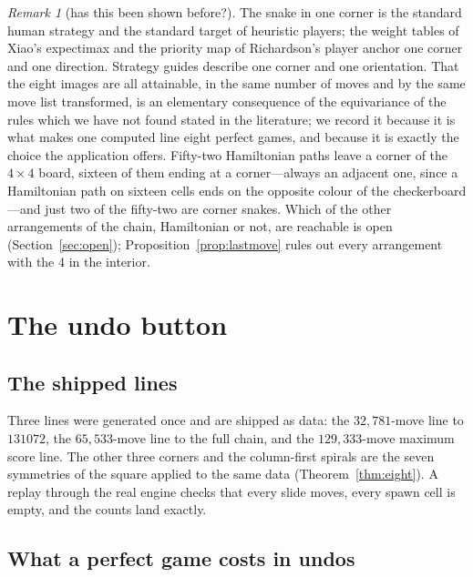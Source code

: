 \documentclass[11pt]{article}
\theoremstyle{definition}
\theoremstyle{remark}
\newtheorem{remark}[theorem]{Remark}
\begin{document}
\begin{remark}[has this been shown before?]
The snake in one corner is the standard human strategy and the standard
target of heuristic players; the weight tables of Xiao's expectimax
\cite{nneonneo2014} and the priority map of Richardson's player
\cite{richardson2014} anchor one corner and one direction. Strategy guides
describe one corner and one orientation. That the eight images are all
attainable, in the same number of moves and by the same move list
transformed, is an elementary consequence of the equivariance of the
rules which we have not found stated in the literature; we record it
because it is what makes one computed line eight perfect games, and
because it is exactly the choice the application offers. Fifty-two
Hamiltonian paths leave a corner of the $4\times4$ board, sixteen of them
ending at a corner---always an adjacent one, since a Hamiltonian path on
sixteen cells ends on the opposite colour of the checkerboard---and just
two of the fifty-two are corner snakes. Which of the other arrangements of
the chain, Hamiltonian or not, are reachable is open
(Section~\ref{sec:open}); Proposition~\ref{prop:lastmove} rules out every
arrangement with the 4 in the interior.
\end{remark}

\section{The undo button}\label{sec:undo}

\subsection{The shipped lines}\label{sec:lines}

Three lines were generated once and are shipped as data: the
$32{,}781$-move line to $131072$, the $65{,}533$-move line to the full
chain, and the $129{,}333$-move maximum score line. The other three
corners and the column-first spirals are the seven symmetries of the
square applied to the same data (Theorem~\ref{thm:eight}). A replay
through the real engine checks that every slide moves, every spawn cell is
empty, and the counts land exactly.

\subsection{What a perfect game costs in undos}
\end{document}
